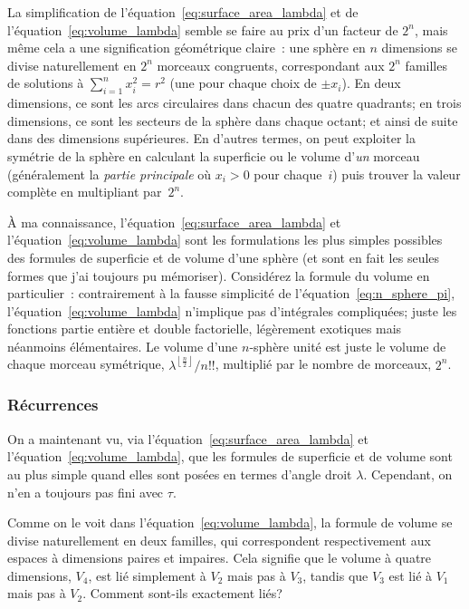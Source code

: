 La simplification de l'équation~\eqref{eq:surface_area_lambda} et de
l'équation~\eqref{eq:volume_lambda} semble se faire au prix d'un facteur de $2^n$,
mais même cela a une signification géométrique claire~: une sphère en $n$
dimensions se divise naturellement en $2^n$ morceaux congruents, correspondant
aux $2^n$ familles de solutions à $\sum_{i=1}^{n} x_i^2 = r^2$ (une pour chaque
choix de $\pm x_i$). En deux dimensions, ce sont les arcs circulaires dans
chacun des quatre quadrants\ns; en trois dimensions, ce sont les secteurs de la
sphère dans chaque octant\ns; et ainsi de suite dans des dimensions supérieures.
En d'autres termes, on peut exploiter la symétrie de la sphère en calculant la
superficie ou le volume d'\emph{un} morceau (généralement la \emph{partie
principale} où $x_i > 0$ pour chaque~$i$) puis trouver la valeur complète en multipliant
par~$2^n$.

À ma connaissance, l'équation~\eqref{eq:surface_area_lambda} et
l'équation~\eqref{eq:volume_lambda} sont les formulations les plus simples
possibles des formules de superficie et de volume d'une sphère (et sont en fait les
seules formes que j'ai toujours pu mémoriser). Considérez la formule du volume
en particulier~: contrairement à la fausse simplicité de
l'équation~\eqref{eq:n_sphere_pi}, l'équation~\eqref{eq:volume_lambda}
n'implique pas d'intégrales compliquées\ns; juste les fonctions partie entière et double factorielle, légèrement
exotiques mais néanmoins élémentaires. Le
volume d'une $n$-sphère unité est juste le volume de chaque morceau symétrique,
$\lambda^{\left\lfloor \frac{n}{2} \right\rfloor}/n!!$, multiplié par le nombre
de morceaux, $2^n$.


\subsubsection{Récurrences} %
\label{sec:recurrences}

On a maintenant vu, via l'équation~\eqref{eq:surface_area_lambda} et
l'équation~\eqref{eq:volume_lambda}, que les formules de superficie et de volume
sont au plus simple quand elles sont posées en termes d'angle droit $\lambda$. Cependant, on n'en a
toujours pas fini avec $\tau$.

Comme on le voit dans l'équation~\eqref{eq:volume_lambda}, la formule de volume
se divise naturellement en deux familles, qui correspondent respectivement aux
espaces à dimensions paires et impaires. Cela signifie que le volume à quatre
dimensions, $V_4$, est lié simplement à $V_2$ mais pas à $V_3$, tandis que $V_3$
est lié à $V_1$ mais pas à $V_2$. Comment sont-ils exactement liés\ns?

